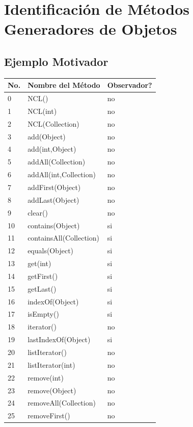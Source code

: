 \chapter[Identificación de Métodos Generadores de Objetos]{Identificación de Métodos Generadores de Objetos}
\label{cap:builders}


\section{Ejemplo Motivador}
\label{sec:motivacionBuilders}
\begin{table}[]
\centering
{\scriptsize
\begin{tabular}{|l|l|l|}
\hline
No. & Nombre del Método & Observador? \\
\hline
0 & NCL() & no \\
1 & NCL(int) & no \\
2 & NCL(Collection) & no \\
3 & add(Object) & no \\
4 & add(int,Object) & no \\
5 & addAll(Collection) & no \\
6 & addAll(int,Collection) & no \\
7 & addFirst(Object) & no \\
8 & addLast(Object) & no \\
9 & clear() & no \\
10 & contains(Object) & si \\
11 & containsAll(Collection) & si \\
12 & equals(Object) & si \\
13 & get(int) & si \\
14 & getFirst() & si \\
15 & getLast() & si \\
16 & indexOf(Object) & si \\
17 & isEmpty() & si \\
18 & iterator() & no \\
19 & lastIndexOf(Object) & si \\
20 & listIterator() & no \\
21 & listIterator(int) & no \\
22 & remove(int) & no \\
23 & remove(Object) & no \\
24 & removeAll(Collection) & no \\
25 & removeFirst() & no \\

\end{tabular}}
\end{table}
